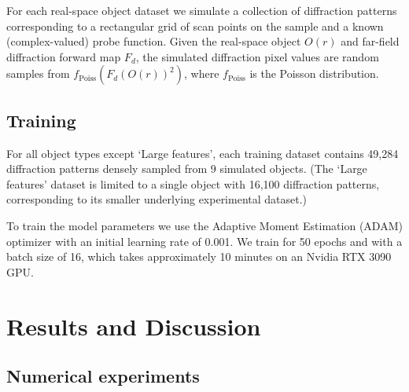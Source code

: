 \documentclass[sn-mathphys]{sn-jnl}%
\theoremstyle{thmstyleone}%
\theoremstyle{thmstyletwo}%
\theoremstyle{thmstylethree}%
\begin{document}
For each real-space object dataset we simulate a collection of diffraction patterns corresponding to a rectangular grid of scan points on the sample and a known (complex-valued) probe function. Given the real-space object $O(r)$ and far-field diffraction forward map $F_d$, the simulated diffraction pixel values are random samples from $f_{\text{Poiss}}(F_d(O(r))^2)$, where $f_{\text{Poiss}}$ is the Poisson distribution.


\subsection{Training}
For all object types except `Large features', each training dataset contains 49,284 diffraction patterns densely sampled from 9 simulated objects. (The `Large features' dataset is limited to a single object with 16,100 diffraction patterns, corresponding to its smaller underlying experimental dataset.)

To train the model parameters we use the Adaptive Moment Estimation (ADAM) optimizer with an initial learning rate of 0.001.\cite{kingma2014adam} We train for 50 epochs and with a batch size of 16, which takes approximately 10 minutes on an Nvidia RTX 3090 GPU.


\section{Results and Discussion}

\subsection{Numerical experiments}


\end{document}
